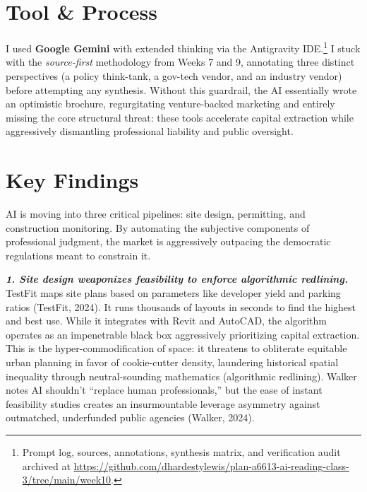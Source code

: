\documentclass[11pt, twocolumn]{article}
\begin{document}

\section*{Tool \& Process}
I used \textbf{Google Gemini} with extended thinking via the Antigravity IDE.\footnote{Prompt log, sources, annotations, synthesis matrix, and verification audit archived at \url{https://github.com/dhardestylewis/plan-a6613-ai-reading-class-3/tree/main/week10}.} I stuck with the \textit{source-first} methodology from Weeks 7 and 9, annotating three distinct perspectives (a policy think-tank, a gov-tech vendor, and an industry vendor) before attempting any synthesis. Without this guardrail, the AI essentially wrote an optimistic brochure, regurgitating venture-backed marketing and entirely missing the core structural threat: these tools accelerate capital extraction while aggressively dismantling professional liability and public oversight.

\section*{Key Findings}
\noindent AI is moving into three critical pipelines: site design, permitting, and construction monitoring. By automating the subjective components of professional judgment, the market is aggressively outpacing the democratic regulations meant to constrain it.

\textbf{\textit{1. Site design weaponizes feasibility to enforce algorithmic redlining.}}
TestFit maps site plans based on parameters like developer yield and parking ratios (TestFit, 2024). It runs thousands of layouts in seconds to find the highest and best use. While it integrates with Revit and AutoCAD, the algorithm operates as an impenetrable black box aggressively prioritizing capital extraction. This is the hyper-commodification of space: it threatens to obliterate equitable urban planning in favor of cookie-cutter density, laundering historical spatial inequality through neutral-sounding mathematics (algorithmic redlining). Walker notes AI shouldn't ``replace human professionals,'' but the ease of instant feasibility studies creates an insurmountable leverage asymmetry against outmatched, underfunded public agencies (Walker, 2024).
\end{document}

